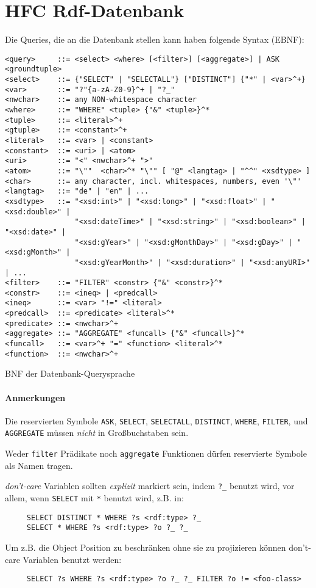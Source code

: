 \section{HFC Rdf-Datenbank}

Die Queries, die an die Datenbank stellen kann haben folgende Syntax (EBNF):
\begin{table}[h]
  \centering\small
\begin{verbatim}
<query>     ::= <select> <where> [<filter>] [<aggregate>] | ASK <groundtuple>
<select>    ::= {"SELECT" | "SELECTALL"} ["DISTINCT"] {"*" | <var>^+}
<var>       ::= "?"{a-zA-Z0-9}^+ | "?_"
<nwchar>    ::= any NON-whitespace character
<where>     ::= "WHERE" <tuple> {"&" <tuple>}^*
<tuple>     ::= <literal>^+
<gtuple>    ::= <constant>^+
<literal>   ::= <var> | <constant>
<constant>  ::= <uri> | <atom>
<uri>       ::= "<" <nwchar>^+ ">"
<atom>      ::= "\""  <char>^* "\"" [ "@" <langtag> | "^^" <xsdtype> ]
<char>      ::= any character, incl. whitespaces, numbers, even '\"'
<langtag>   ::= "de" | "en" | ...
<xsdtype>   ::= "<xsd:int>" | "<xsd:long>" | "<xsd:float>" | "<xsd:double>" |
                "<xsd:dateTime>" | "<xsd:string>" | "<xsd:boolean>" | "<xsd:date>" |
                "<xsd:gYear>" | "<xsd:gMonthDay>" | "<xsd:gDay>" | "<xsd:gMonth>" |
                "<xsd:gYearMonth>" | "<xsd:duration>" | "<xsd:anyURI>" | ...
<filter>    ::= "FILTER" <constr> {"&" <constr>}^*
<constr>    ::= <ineq> | <predcall>
<ineq>      ::= <var> "!=" <literal>
<predcall>  ::= <predicate> <literal>^*
<predicate> ::= <nwchar>^+
<aggregate> ::= "AGGREGATE" <funcall> {"&" <funcall>}^*
<funcall>   ::= <var>^+ "=" <function> <literal>^*
<function>  ::= <nwchar>^+
\end{verbatim}
  \caption{BNF der Datenbank-Querysprache}
  \label{tab:hfcquerybnf}
\end{table}

\paragraph{Anmerkungen}

Die reservierten Symbole \texttt{ASK}, \texttt{SELECT}, \texttt{SELECTALL},
\texttt{DISTINCT}, \texttt{WHERE}, \texttt{FILTER}, und \texttt{AGGREGATE}
müssen \emph{nicht} in Großbuchstaben sein.

Weder \texttt{filter} Prädikate noch \texttt{aggregate} Funktionen dürfen
reservierte Symbole als Namen tragen.

\emph{don't-care} Variablen sollten \emph{explizit} markiert sein, indem
\verb|?_| benutzt wird, vor allem, wenn \texttt{SELECT} mit \verb|*| benutzt
wird, z.B. in:
\begin{verbatim}
     SELECT DISTINCT * WHERE ?s <rdf:type> ?_
     SELECT * WHERE ?s <rdf:type> ?o ?_ ?_
\end{verbatim}
Um z.B. die Object Position zu beschränken ohne sie zu projizieren können
don't-care Variablen benutzt werden:
\begin{verbatim}
     SELECT ?s WHERE ?s <rdf:type> ?o ?_ ?_ FILTER ?o != <foo-class>
\end{verbatim}

